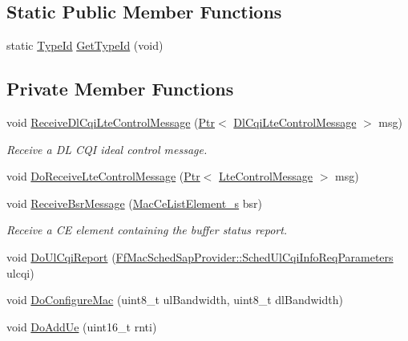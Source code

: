 \subsection*{Static Public Member Functions}
\begin{DoxyCompactItemize}
\item 
static \hyperlink{classns3_1_1TypeId}{Type\+Id} \hyperlink{classns3_1_1LteEnbMac_afc35c076ccdb8cb4b4f346c45e1af8af}{Get\+Type\+Id} (void)
\end{DoxyCompactItemize}
\subsection*{Private Member Functions}
\begin{DoxyCompactItemize}
\item 
void \hyperlink{classns3_1_1LteEnbMac_ac1ee0a507c7df7d0541eaf056772d33a}{Receive\+Dl\+Cqi\+Lte\+Control\+Message} (\hyperlink{classns3_1_1Ptr}{Ptr}$<$ \hyperlink{classns3_1_1DlCqiLteControlMessage}{Dl\+Cqi\+Lte\+Control\+Message} $>$ msg)
\begin{DoxyCompactList}\small\item\em Receive a DL C\+QI ideal control message. \end{DoxyCompactList}\item 
void \hyperlink{classns3_1_1LteEnbMac_a5949f6df3db0bdacc4829df0907f9224}{Do\+Receive\+Lte\+Control\+Message} (\hyperlink{classns3_1_1Ptr}{Ptr}$<$ \hyperlink{classns3_1_1LteControlMessage}{Lte\+Control\+Message} $>$ msg)
\item 
void \hyperlink{classns3_1_1LteEnbMac_a7f4e9d377368a0f1ff382fd74c69aef8}{Receive\+Bsr\+Message} (\hyperlink{structns3_1_1MacCeListElement__s}{Mac\+Ce\+List\+Element\+\_\+s} bsr)
\begin{DoxyCompactList}\small\item\em Receive a CE element containing the buffer status report. \end{DoxyCompactList}\item 
void \hyperlink{classns3_1_1LteEnbMac_afaba77ac0d2ef2c417010da6a2e858e5}{Do\+Ul\+Cqi\+Report} (\hyperlink{structns3_1_1FfMacSchedSapProvider_1_1SchedUlCqiInfoReqParameters}{Ff\+Mac\+Sched\+Sap\+Provider\+::\+Sched\+Ul\+Cqi\+Info\+Req\+Parameters} ulcqi)
\item 
void \hyperlink{classns3_1_1LteEnbMac_a225d0774779e7d358f7ba3b383991035}{Do\+Configure\+Mac} (uint8\+\_\+t ul\+Bandwidth, uint8\+\_\+t dl\+Bandwidth)
\item 
void \hyperlink{classns3_1_1LteEnbMac_ae571cf82d38972629b6ddd95bc614e00}{Do\+Add\+Ue} (uint16\+\_\+t rnti)

\end{DoxyCompactItemize}
